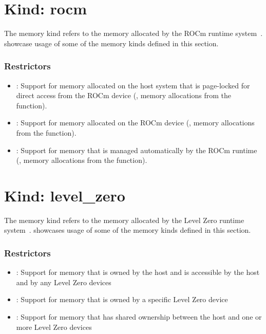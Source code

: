 \section{Kind: rocm}

The  memory kind refers to the memory allocated by the ROCm
runtime system~\cite{rocmref}.
showcase usage of some of the memory kinds defined in this section.

\subsubsection{Restrictors}

\begin{itemize}

\item {}: Support for memory allocated on the host system that
    is page-locked for direct access from the ROCm device (\eg, memory
        allocations from the  function).

\item {}: Support for memory allocated on the ROCm device
    (\eg, memory allocations from the  function).

\item {}: Support for memory that is managed automatically
    by the ROCm runtime (\eg, memory allocations from the
         function).

\end{itemize}

\section{Kind: level\_zero}

The  memory kind refers to the memory allocated by the
Level Zero runtime system~\cite{zeref}.
 showcases usage of some of the memory
kinds defined in this section.

\subsubsection{Restrictors}

\begin{itemize}

\item {}: Support for memory that is owned by the host and is accessible by the host and by any Level Zero devices

\item {}: Support for memory that is owned by a specific Level Zero device

\item {}: Support for memory that has shared ownership between the host and one or more Level Zero devices

\end{itemize}

